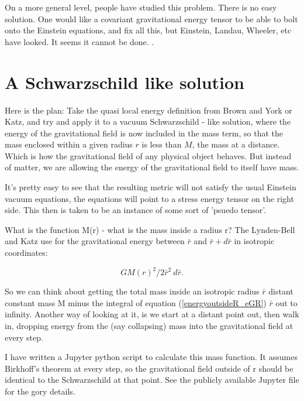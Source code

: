 \documentclass[../rzero]{subfiles}
\begin{document}
On a more general level, people have studied this problem. There is no easy solution. One would like a covariant gravitational energy tensor to be able to bolt onto the Einstein equations, and fix all this, but Einstein, Landau, Wheeler, etc have looked. It seems it cannot be done.  \cite{08092323EnergyMomentumGravitational}. 


\section{A Schwarzschild like solution} 
Here is the plan: Take the quasi local energy definition from Brown and York\cite{Brown1993} or Katz\cite{Katz2005}, and try and apply it to a vacuum Schwarzschild - like solution, where the energy of the gravitational field is now included in the mass term, so that the mass enclosed within a given radius $r$ is less than $M$, the mass at a distance. Which is how the gravitational field of any physical object behaves. But instead of matter, we are allowing the energy of the gravitational field to itself have mass. 

It's pretty easy to see that the resulting metric will not satisfy the usual Einstein vacuum equations, the equations will point to a stress energy tensor on the right side. This then is taken to be an instance of some sort of 'psuedo tensor'. 

What is the function M(r) - what is the mass inside a radius r? 
The Lynden-Bell and Katz\cite{lyndenbell1985} use for the gravitational energy between  $\bar r$ and $\bar r + d \bar r$ in isotropic coordinates: 

\begin{equation} \label{energyoutsideR_eGR}
 GM(r)^2/2 \bar r^2 \ d \bar r.
\end{equation}

So we can think about getting the total mass inside an isotropic radius $\bar r$ distant constant mass M minus the integral of equation (\ref{energyoutsideR_eGR}) $\bar r$ out to infinity. Another way of looking at it, is we start at a distant point out, then walk in, dropping energy from the (say collapsing) mass into the gravitational field at every step. 

I have written a Jupyter python script to calculate this mass function. It assumes Birkhoff's theorem at every step, so the gravitational field outside of r should be identical to the Schwarzschild at that point. See the publicly available Jupyter file\cite{RzeroJupyterGravitationalEnergyipynb} for the gory details. 
\end{document}
